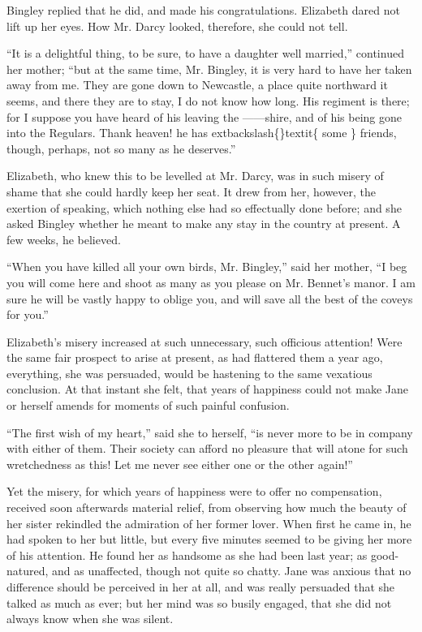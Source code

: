 \documentclass[10pt]{book}
\begin{document}
   Bingley replied that he did, and made his congratulations. Elizabeth
dared not lift up her eyes. How Mr. Darcy looked, therefore, she could
not tell.
  

   “It is a delightful thing, to be sure, to have a daughter well married,”
continued her mother; “but at the same time, Mr. Bingley, it is very
hard to have her taken away from me. They are gone down to Newcastle, a
place quite northward it seems, and there they are to stay, I do not
know how long. His regiment is there; for I suppose you have heard of
his leaving the ——shire, and of his being gone into the Regulars.
Thank heaven!
   he has
   	extbackslash\{\}textit\{
    some
   \}
   friends, though, perhaps, not so many as he
deserves.”
  

   Elizabeth, who knew this to be levelled at Mr. Darcy, was in such misery
of shame that she could hardly keep her seat. It drew from her, however,
the exertion of speaking, which nothing else had so effectually done
before; and she asked Bingley whether he meant to make any stay in the
country at present. A few weeks, he believed.
  

   “When you have killed all your own birds, Mr. Bingley,” said her mother,
“I beg you will come here and shoot as many as you please on Mr.
Bennet’s manor. I am sure he will be vastly happy to oblige you, and
will save all the best of the coveys for you.”
  

   Elizabeth’s misery increased at such unnecessary, such officious
attention! Were the same fair prospect to arise at present, as had
flattered them a year ago, everything, she was persuaded, would be
hastening to the same vexatious conclusion. At that instant she felt,
that years of happiness could not make Jane or herself amends for
moments of such painful confusion.
  

   “The first wish of my heart,” said she to herself, “is never more to be
in company with either of them. Their society can afford no pleasure
that will atone for such wretchedness as this! Let me never see either
one or the other again!”
  

   Yet the misery, for which years of happiness were to offer no
compensation, received soon afterwards material relief, from observing
how much the beauty of her sister rekindled the admiration of her former
lover. When first he came in, he had spoken to her but little, but every
five minutes seemed to be giving her more of his attention. He found her
as handsome as she had
   been last year; as good-natured, and as
unaffected, though not quite so chatty. Jane was anxious that no
difference should be perceived in her at all, and was really persuaded
that she talked as much as ever; but her mind was so busily engaged,
that she did not always know when she was silent.
  
\end{document}
